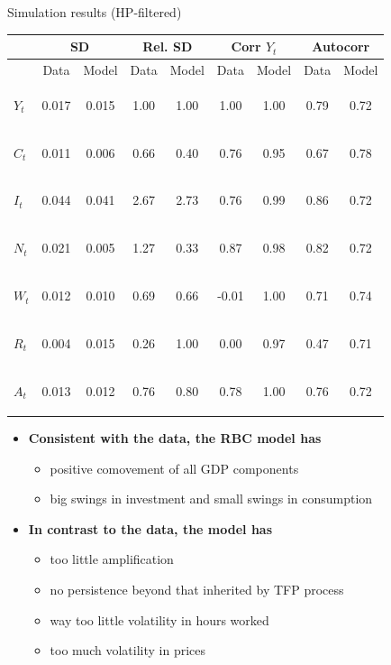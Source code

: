 \documentclass[9pt,xcolor={dvipsnames}]{beamer}
\newcommand{\goodcell}[1]{\begingroup\setlength{\fboxsep}{1.2pt}\colorbox{goodbg}{\strut #1}\endgroup}
\newcommand{\badcell}[1]{\begingroup\setlength{\fboxsep}{1.2pt}\colorbox{badbg}{\strut #1}\endgroup}
\newcommand{\goodcallout}[1]{\begingroup\setlength{\fboxsep}{1.6pt}\colorbox{goodbg}{\textbf{#1}}\endgroup}
\newcommand{\badcallout}[1]{\begingroup\setlength{\fboxsep}{1.6pt}\colorbox{badbg}{\textbf{#1}}\endgroup}
\newcommand{\bit}{\begin{itemize}}
\newcommand{\eit}{\end{itemize}}
\begin{document}
\begin{frame}{Simulation results (HP-filtered)}

\begin{table}[h!]
	\centering
	\begin{tabular}{|l|cc|cc|cc|cc|}
		\multicolumn{1}{c}{} &\multicolumn{2}{c}{\textbf{SD}}&\multicolumn{2}{c}{\textbf{Rel. SD}}& \multicolumn{2}{c}{\textbf{Corr $Y_t$}} & \multicolumn{2}{c}{\textbf{Autocorr}}  \\
		\hline
		& Data &Model & Data & Model & Data & Model & Data & Model \\
		\hline
		$Y_t$ & 0.017 & 0.015 & 1.00 & 1.00 & 1.00 & 1.00 & \badcell{0.79} & \badcell{0.72} \\
		\hline
		$C_t$ & 0.011 & 0.006  & \goodcell{0.66} & \goodcell{0.40} & \goodcell{0.76} & \goodcell{0.95}  & 0.67 & 0.78 \\
		\hline
		$I_t$ & 0.044 & 0.041 & \goodcell{2.67} & \goodcell{2.73}  & \goodcell{0.76} & \goodcell{0.99} & 0.86 & 0.72 \\
		\hline
		$N_t$ & 0.021 &  0.005 & \badcell{1.27} & \badcell{0.33} & \goodcell{0.87} &  \goodcell{0.98} & 0.82 & 0.72 \\
		\hline
		$W_t$ & 0.012 & 0.010 & 0.69 & 0.66 & \badcell{-0.01} & \badcell{1.00} & 0.71 & 0.74 \\
		\hline
		$R_t$ & 0.004 & 0.015  & \badcell{0.26} & \badcell{1.00} & \badcell{0.00} & \badcell{0.97} & \badcell{0.47} & \badcell{0.71} \\
		\hline
		$A_t$ & 0.013 & 0.012 & \badcell{0.76} & \badcell{0.80}  & 0.78 & 1.00 & 0.76 & 0.72 \\
		\hline
	\end{tabular}
	\captionsetup{font=small}
\end{table}

\bit
\setlength\itemsep{1em} 

\item \goodcallout{Consistent with the data, the RBC model has}
\bit
\item {\color{black} positive comovement of all GDP components}
\item {\color{black} big swings in investment and small swings in consumption}
\eit


\item \badcallout{In contrast to the data, the model has}
\bit
\item {\color{black} too little amplification}
\item {\color{black} no persistence beyond that inherited by TFP process}
\item {\color{black} way too little volatility in hours worked}
\item {\color{black} too much volatility in prices}
\eit

\eit

\end{frame}
\end{document}
